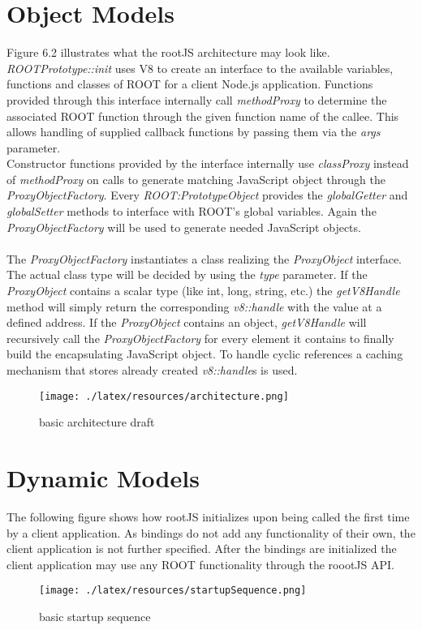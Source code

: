 \section{Object Models}
Figure 6.2 illustrates what the rootJS architecture may look like.\\
\textit{ROOTPrototype::init} uses V8 to create an interface to the available variables, functions and classes of ROOT for a client Node.js application.
Functions provided through this interface internally call \textit{methodProxy} to determine the associated ROOT function through the given function name of the callee. This allows handling of supplied callback functions by passing them via the \textit{args} parameter.\\
Constructor functions provided by the interface internally use \textit{classProxy} instead of \textit{methodProxy} on calls to generate matching JavaScript object through the \textit{ProxyObjectFactory}.
Every \textit{ROOT:PrototypeObject} provides the \textit{globalGetter} and \textit{globalSetter} methods to interface with ROOT's global variables. Again the \textit{ProxyObjectFactory} will be used to generate needed JavaScript objects.
\\ \\
The \textit{ProxyObjectFactory} instantiates a class realizing the \textit{ProxyObject} interface. The actual class type will be decided by using the \textit{type} parameter.
If the \textit{ProxyObject} contains a scalar type (like int, long, string, etc.) the \textit{getV8Handle} method will simply return the corresponding \textit{v8::handle} with the value at a defined address.
If the \textit{ProxyObject} contains an object, \textit{getV8Handle} will recursively call the \textit{ProxyObjectFactory} for every element it contains to finally build the encapsulating JavaScript object.
To handle cyclic references a caching mechanism that stores already created \textit{v8::handle}s is used.

\begin{figure}[htb]
	\centering
	\texttt{[image: ./latex/resources/architecture.png]}
	\caption{basic architecture draft}
\end{figure}

\pagebreak[4]

\section{Dynamic Models}
The following figure shows how rootJS initializes upon being called the first time by a client application. As bindings do not add any functionality of their own, the client application is not further specified. After the bindings are initialized the client application may use any ROOT functionality through the roootJS API.
\begin{figure}[htb]
	\centering
	\texttt{[image: ./latex/resources/startupSequence.png]}
	\caption{basic startup sequence}
\end{figure}
